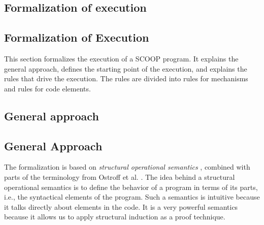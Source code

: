 \begin{fortechnicalreport}
\section{Formalization of execution}
\end{fortechnicalreport}
\begin{forjournal}
\section{Formalization of Execution}
\end{forjournal}
\label{sec:execution-formalization}
This section formalizes the execution of a SCOOP program. It explains the general approach, defines the starting point of the execution, and explains the rules that drive the execution. The rules are divided into rules for mechanisms and rules for code elements.

\begin{fortechnicalreport}
\subsection{General approach}
\end{fortechnicalreport}
\begin{forjournal}
\subsection{General Approach}
\end{forjournal}
The formalization is based on \emph{structural operational semantics} \cite{plotkin:2004:structural_operational_semantics}, combined with parts of the terminology from Ostroff et al. \cite{ostroff-torshizi-huang-schoeller:2008:formal_semantics_for_SCOOP}. The idea behind a structural operational semantics is to define the behavior of a program in terms of its parts, i.e., the syntactical elements of the program. Such a semantics is intuitive because it talks directly about elements in the code. It is a very powerful semantics because it allows us to apply structural induction as a proof technique.

